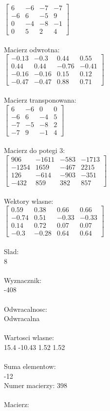 \documentclass[a4paper,12pt]{article}
\begin{document}
$\begin{bmatrix} 6&-6&-7&-7\\-6&6&-5&9\\0&-4&-8&-1\\0&5&2&4 \end{bmatrix}$
\\
\\
Macierz odwrotna:\\

$\begin{bmatrix} -0.13&-0.3&0.44&0.55\\0.44&0.44&-0.76&-0.41\\-0.16&-0.16&0.15&0.12\\-0.47&-0.47&0.88&0.71 \end{bmatrix}$
\\
\\
Macierz transponowana:\\

$\begin{bmatrix} 6&-6&0&0\\-6&6&-4&5\\-7&-5&-8&2\\-7&9&-1&4 \end{bmatrix}$
\\
\\
Macierz do potegi 3:\\

$\begin{bmatrix} 906&-1611&-583&-1713\\-1254&1659&-467&2215\\126&-614&-903&-351\\-432&859&382&857 \end{bmatrix}$
\\
\\
Wektory wlasne:\\

$\begin{bmatrix} 0.59&0.38&0.66&0.66\\-0.74&0.51&-0.33&-0.33\\0.14&0.72&0.07&0.07\\-0.3&-0.28&0.64&0.64 \end{bmatrix}$
\\
\\
Slad:\\
8
\\
\\
Wyznacznik:\\
-408
\\
\\
Odwracalnosc:\\
Odwracalna
\\
\\
Wartosci wlasne:\\
15.4 -10.43 1.52 1.52
\\
\\
Suma elementow:\\
-12
\\
\newpage
Numer macierzy:
398
\\
\\
Macierz:\\
\end{document}
